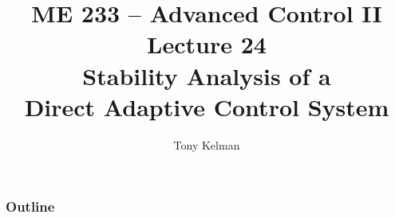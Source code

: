 \documentclass[handout,mathserif]{beamer}       %
\title{ME 233 -- Advanced Control II\\
    Lecture 24 \\
    Stability Analysis of a \\
    Direct Adaptive Control System}
\author{Tony Kelman}
\institute{UC Berkeley}
\begin{document}
\maketitle

\begin{frame}
    \frametitle{Outline}
    \tableofcontents
\end{frame}









\end{document}
